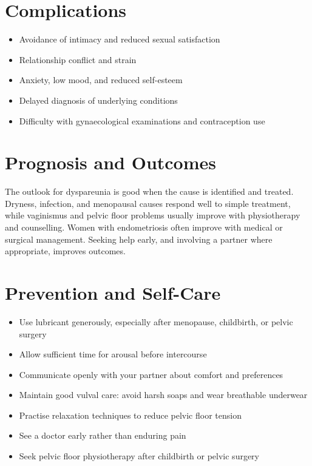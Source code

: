 \section*{Complications}
\begin{itemize}
    \item Avoidance of intimacy and reduced sexual satisfaction
    \item Relationship conflict and strain
    \item Anxiety, low mood, and reduced self-esteem
    \item Delayed diagnosis of underlying conditions
    \item Difficulty with gynaecological examinations and contraception use
\end{itemize}

\section*{Prognosis and Outcomes}
The outlook for dyspareunia is good when the cause is identified and treated. Dryness, infection, and menopausal causes respond well to simple treatment, while vaginismus and pelvic floor problems usually improve with physiotherapy and counselling. Women with endometriosis often improve with medical or surgical management. Seeking help early, and involving a partner where appropriate, improves outcomes.

\section*{Prevention and Self-Care}
\begin{itemize}
    \item Use lubricant generously, especially after menopause, childbirth, or pelvic surgery
    \item Allow sufficient time for arousal before intercourse
    \item Communicate openly with your partner about comfort and preferences
    \item Maintain good vulval care: avoid harsh soaps and wear breathable underwear
    \item Practise relaxation techniques to reduce pelvic floor tension
    \item See a doctor early rather than enduring pain
    \item Seek pelvic floor physiotherapy after childbirth or pelvic surgery
\end{itemize}

